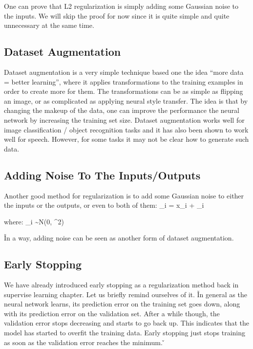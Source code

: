 One can prove that L2 regularization is simply adding some Gaussian noise to the inputs. We will skip the proof for 
now since it is quite simple and quite unnecessary at the same time.

\subsection{Dataset Augmentation}

Dataset augmentation is a very simple technique based one the idea ``more data = better learning'', where it applies 
transformations to the training examples in order to create more for them. The transformations can be as simple as 
flipping an image, or as complicated as applying neural style transfer. The idea is that by changing the makeup of 
the data, one can improve the performance the neural network by increasing the training set size. Dataset 
augmentation works well for image classification / object recognition tasks and it has also been shown to work well 
for speech. However, for some tasks it may not be clear how to generate such data.

\subsection{Adding Noise To The Inputs/Outputs}

Another good method for regularization is to add some Gaussian noise to either the inputs or the outputs, or even to 
both of them:
\bse
{}_{i} = x_i + \epsilon_i
\ese

where:
\bse
\epsilon_i \sim N(0, \sigma^2)
\ese

\v

In a way, adding noise can be seen as another form of dataset augmentation.

\subsection{Early Stopping}

We have already introduced early stopping as a regularization method back in supervise learning chapter. Let us 
briefly remind ourselves of it. \v

In general as the neural network learns, its prediction error on the training set goes down, along with its 
prediction error on the validation set. After a while though, the validation error stops decreasing and starts to go 
back up. This indicates that the model has started to overfit the training data. Early stopping just stops training 
as soon as the validation error reaches the minimum. \v

